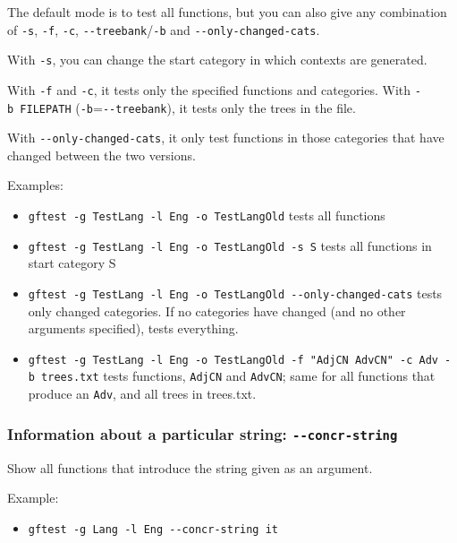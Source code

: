 The default mode is to test all functions, but you can also give any
combination of \texttt{-s}, \texttt{-f}, \texttt{-c},
\texttt{-\/-treebank}/\texttt{-b} and \texttt{-\/-only-changed-cats}.

With \texttt{-s}, you can change the start category in which contexts
are generated.

With \texttt{-f} and \texttt{-c}, it tests only the specified functions
and categories. With \texttt{-b\ FILEPATH}
(\texttt{-b}=\texttt{-\/-treebank}), it tests only the trees in the
file.

With \texttt{-\/-only-changed-cats}, it only test functions in those
categories that have changed between the two versions.

Examples:

\begin{itemize}
\tightlist
\item
  \texttt{gftest\ -g\ TestLang\ -l\ Eng\ -o\ TestLangOld} tests all
  functions
\item
  \texttt{gftest\ -g\ TestLang\ -l\ Eng\ -o\ TestLangOld\ -s\ S} tests
  all functions in start category S
\item
  \texttt{gftest\ -g\ TestLang\ -l\ Eng\ -o\ TestLangOld\ -\/-only-changed-cats}
  tests only changed categories. If no categories have changed (and no
  other arguments specified), tests everything.
\item
  \texttt{gftest\ -g\ TestLang\ -l\ Eng\ -o\ TestLangOld\ -f\ "AdjCN\ AdvCN"\ -c\ Adv\ -b\ trees.txt}
  tests functions, \texttt{AdjCN} and \texttt{AdvCN}; same for all
  functions that produce an \texttt{Adv}, and all trees in trees.txt.
\end{itemize}

\hypertarget{information-about-a-particular-string---concr-string}{%
\subsubsection{\texorpdfstring{Information about a particular string:
\texttt{-\/-concr-string}}{Information about a particular string: -\/-concr-string}}\label{information-about-a-particular-string---concr-string}}

Show all functions that introduce the string given as an argument.

Example:

\begin{itemize}
\tightlist
\item
  \texttt{gftest\ -g\ Lang\ -l\ Eng\ -\/-concr-string\ it}
\end{itemize}

